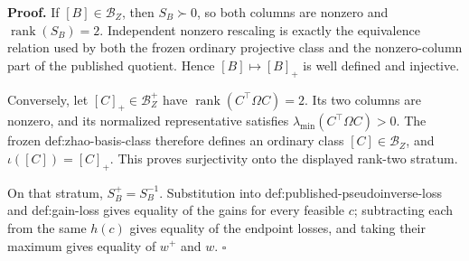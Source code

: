 \textbf{Proof.}
If \([B]\in\mathcal B_Z\), then \(S_B\succ0\), so both columns are nonzero and \(\operatorname{rank}(S_B)=2\).  Independent nonzero rescaling is exactly the equivalence relation used by both the frozen ordinary projective class and the nonzero-column part of the published quotient.  Hence \([B]\mapsto[B]_+\) is well defined and injective.

Conversely, let \([C]_+\in\mathcal B_Z^+\) have \(\operatorname{rank}(C^{\top}\Omega C)=2\).  Its two columns are nonzero, and its normalized representative satisfies \(\lambda_{\min}(C^{\top}\Omega C)>0\).  The frozen def:zhao-basis-class therefore defines an ordinary class \([C]\in\mathcal B_Z\), and \(\iota([C])=[C]_+\).  This proves surjectivity onto the displayed rank-two stratum.

On that stratum, \(S_B^+=S_B^{-1}\).  Substitution into def:published-pseudoinverse-loss and def:gain-loss gives equality of the gains for every feasible \(c\); subtracting each from the same \(h(c)\) gives equality of the endpoint losses, and taking their maximum gives equality of \(w^+\) and \(w\). \(\square\)